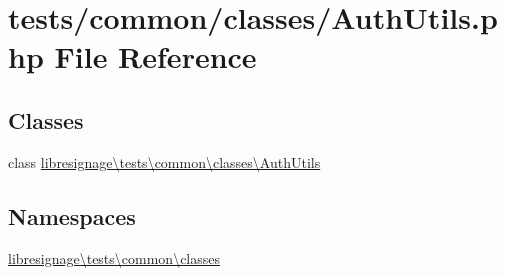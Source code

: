 \hypertarget{AuthUtils_8php}{}\section{tests/common/classes/\+Auth\+Utils.php File Reference}
\label{AuthUtils_8php}
\subsection*{Classes}
\begin{DoxyCompactItemize}
\item 
class \hyperlink{classlibresignage_1_1tests_1_1common_1_1classes_1_1AuthUtils}{libresignage\textbackslash{}tests\textbackslash{}common\textbackslash{}classes\textbackslash{}\+Auth\+Utils}
\end{DoxyCompactItemize}
\subsection*{Namespaces}
\begin{DoxyCompactItemize}
\item 
 \hyperlink{namespacelibresignage_1_1tests_1_1common_1_1classes}{libresignage\textbackslash{}tests\textbackslash{}common\textbackslash{}classes}
\end{DoxyCompactItemize}
